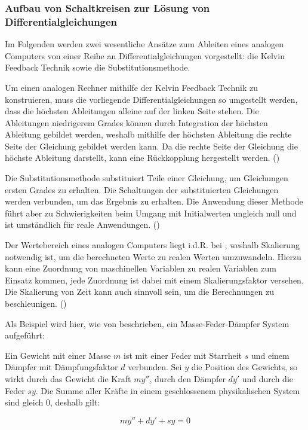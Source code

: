 \subsubsection{Aufbau von Schaltkreisen zur Lösung von Differentialgleichungen}

Im Folgenden werden zwei wesentliche Ansätze zum Ableiten eines analogen Computers von einer Reihe an Differentialgleichungen vorgestellt: die Kelvin Feedback Technik sowie die Substitutionsmethode.

Um einen analogen Rechner mithilfe der Kelvin Feedback Technik zu konstruieren, muss die vorliegende Differentialgleichungen so umgestellt werden, dass die höchsten Ableitungen alleine auf der linken Seite stehen. Die Ableitungen niedrigerem Grades können durch Integration der höchsten Ableitung gebildet werden, weshalb mithilfe der höchsten Ableitung die rechte Seite der Gleichung gebildet werden kann. Da die rechte Seite der Gleichung die höchste Ableitung darstellt, kann eine Rückkopplung hergestellt werden. (\cite[vgl. S. 153 ff.]{Ulmann2022})

Die Substitutionsmethode substituiert Teile einer Gleichung, um Gleichungen ersten Grades zu erhalten. Die Schaltungen der substituierten Gleichungen werden verbunden, um das Ergebnis zu erhalten. Die Anwendung dieser Methode führt aber zu Schwierigkeiten beim Umgang mit Initialwerten ungleich null und ist umständlich für reale Anwendungen. (\cite[vgl. S. 155 ff.]{Ulmann2022})

Der Wertebereich eines analogen Computers liegt i.d.R. bei , weshalb Skalierung notwendig ist, um die berechneten Werte zu realen Werten umzuwandeln. Hierzu kann eine Zuordnung von maschinellen Variablen zu realen Variablen zum Einsatz kommen, jede Zuordnung ist dabei mit einem Skalierungsfaktor versehen. Die Skalierung von Zeit kann auch sinnvoll sein, um die Berechnungen zu beschleunigen. (\cite[vgl. S. 162 ff.]{Ulmann2022})

Als Beispiel wird hier, wie von \cite[S. 168 ff.]{Ulmann2022} beschrieben, ein Masse-Feder-Dämpfer System aufgeführt:

Ein Gewicht mit einer Masse \(m\) ist mit einer Feder mit Starrheit \(s\) und einem Dämpfer mit Dämpfungsfaktor \(d\) verbunden. Sei \(y\) die Position des Gewichts, so wirkt durch das Gewicht die Kraft \(my''\), durch den Dämpfer \(dy'\) und durch die Feder \(sy\). Die Summe aller Kräfte in einem geschlossenem physikalischen System sind gleich 0, deshalb gilt:

\[my''+dy'+sy=0\]

